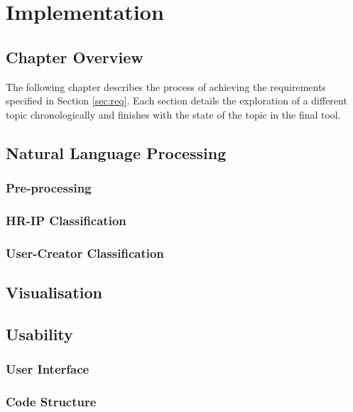 \chapter{Implementation}
	\section{Chapter Overview}
		The following chapter describes the process of achieving the requirements specified in Section \ref{sec:req}. Each section details the exploration of a different topic chronologically and finishes with the state of the topic in the final tool.
	\section{Natural Language Processing}
		\subsection{Pre-processing}
		\subsection{HR-IP Classification}
		\subsection{User-Creator Classification}
	\section{Visualisation}
	\section{Usability}
		\subsection{User Interface}
		\subsection{Code Structure}
	